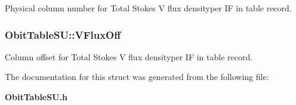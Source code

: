 Physical column number for Total Stokes V flux densityper IF in table record. 

\subsubsection{ {\bf Obit\-Table\-SU::VFlux\-Off}}\label{structObitTableSU_o49}


Column offset for Total Stokes V flux densityper IF in table record. 



The documentation for this struct was generated from the following file:\begin{CompactItemize}
\item 
{\bf Obit\-Table\-SU.h}\end{CompactItemize}
